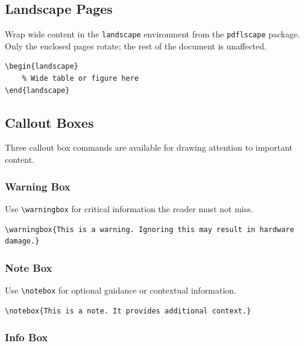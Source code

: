 \subsection{Landscape Pages}

Wrap wide content in the \texttt{landscape} environment from the \texttt{pdflscape} package.
Only the enclosed pages rotate; the rest of the document is unaffected.

\begin{verbatim}
\begin{landscape}
    % Wide table or figure here
\end{landscape}
\end{verbatim}

\subsection{Callout Boxes}

Three callout box commands are available for drawing attention to important content.

\subsubsection*{Warning Box}

Use \texttt{\textbackslash warningbox} for critical information the reader must not miss.


\begin{verbatim}
\warningbox{This is a warning. Ignoring this may result in hardware damage.}
\end{verbatim}

\subsubsection*{Note Box}

Use \texttt{\textbackslash notebox} for optional guidance or contextual information.


\begin{verbatim}
\notebox{This is a note. It provides additional context.}
\end{verbatim}

\subsubsection*{Info Box}

